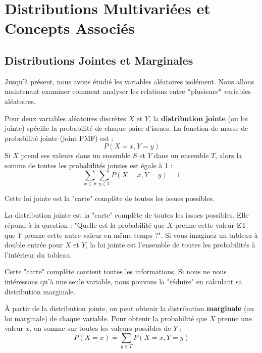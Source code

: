 \newpage
\section{Distributions Multivariées et Concepts Associés}

\subsection{Distributions Jointes et Marginales}

Jusqu'à présent, nous avons étudié les variables aléatoires isolément. Nous allons maintenant examiner comment analyser les relations entre *plusieurs* variables aléatoires.

\begin{definitionbox}
Pour deux variables aléatoires discrètes $X$ et $Y$, la \textbf{distribution jointe} (ou loi jointe) spécifie la probabilité de chaque paire d'issues. La fonction de masse de probabilité jointe (joint PMF) est :
$$P(X=x, Y=y)$$
Si $X$ prend ses valeurs dans un ensemble $S$ et $Y$ dans un ensemble $T$, alors la somme de toutes les probabilités jointes est égale à 1 :
$$\sum_{x \in S} \sum_{y \in T} P(X=x, Y=y) = 1$$
\end{definitionbox}

Cette loi jointe est la "carte" complète de toutes les issues possibles.

\begin{intuitionbox}
La distribution jointe est la "carte" complète de toutes les issues possibles. Elle répond à la question : "Quelle est la probabilité que $X$ prenne cette valeur ET que $Y$ prenne cette autre valeur en même temps ?". Si vous imaginez un tableau à double entrée pour $X$ et $Y$, la loi jointe est l'ensemble de toutes les probabilités à l'intérieur du tableau.
\end{intuitionbox}

Cette "carte" complète contient toutes les informations. Si nous ne nous intéressons qu'à une seule variable, nous pouvons la "réduire" en calculant sa distribution marginale.

\begin{definitionbox}
À partir de la distribution jointe, on peut obtenir la distribution \textbf{marginale} (ou loi marginale) de chaque variable. Pour obtenir la probabilité que $X$ prenne une valeur $x$, on somme sur toutes les valeurs possibles de $Y$ :
$$P(X=x) = \sum_{y \in T} P(X=x, Y=y)$$
\end{definitionbox}

